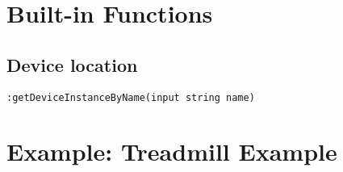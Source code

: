 \documentclass{note}
\begin{document}
\section{Built-in Functions}
\subsection{Device location}
\bit
\w \verb+:getDeviceInstanceByName(input string name)+
\eit


\section{Example: Treadmill Example}

\tableofcontents

%
%
\end{document}
